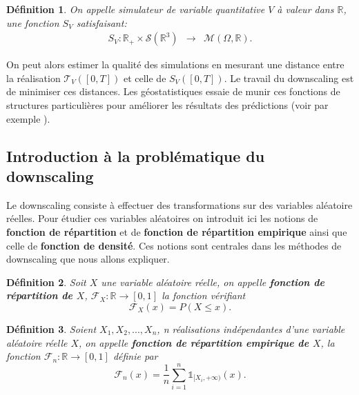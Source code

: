 \documentclass[a4paper,10pt]{article}
\newtheorem{definition}{Définition}
\begin{document}
	\begin{definition}
		\label{simu_terre}
		On appelle simulateur de variable quantitative $V$ à valeur dans $\mathbb{R}$, une fonction $S_V$ satisfaisant:
		\begin{equation}
			\begin{array}{ccc}
				S_V: \mathbb{R}_{+}\times\mathcal{S}(\mathbb{R}^{3}) & \to & \mathcal{M}(\Omega,\mathbb{R}).
			\end{array}
		\end{equation}
	\end{definition}
	
	On peut alors estimer la qualité des simulations en mesurant une distance entre la réalisation $\mathcal{T}_V([0,T])$ et celle de $S_V([0,T])$. Le travail du downscaling est de minimiser ces distances. Les géostatistiques essaie de munir ces fonctions de structures particulières pour améliorer les résultats des prédictions (voir par exemple \cite{lindgren2011explicit}).  
	
	\subsection{Introduction à la problématique du downscaling}
	\label{intro-dwnsc}
	Le downscaling consiste à effectuer des transformations sur des variables aléatoire réelles. Pour étudier ces variables aléatoires on introduit ici les notions de \textbf{fonction de répartition} et de \textbf{fonction de répartition empirique} ainsi que celle de \textbf{fonction de densité}. Ces notions sont centrales dans les méthodes de downscaling que nous allons expliquer.
	
	\begin{definition}
		Soit $X$ une variable aléatoire réelle, on appelle \textbf{fonction de répartition de $X$}, $\mathcal{F}_{X}: \mathbb{R}\to [0,1]$ la fonction vérifiant
		\begin{equation}
			\mathcal{F}_{X}(x)=P(X\leq x).
		\end{equation}
	\end{definition}
	
	\begin{definition}
		Soient $X_1,X_2,...,X_n$, n réalisations indépendantes d'une variable aléatoire réelle $X$, on appelle \textbf{fonction de répartition empirique de $X$}, la fonction $\mathcal{F}_{n}:\mathbb{R}\to [0,1]$ définie par
		\begin{equation}
			\mathcal{F}_{n}(x)= \frac{1}{n}\sum_{i=1}^{n}\mathds{1}_{[X_i, +\infty )}(x).
		\end{equation}
	\end{definition}
	
\end{document}
